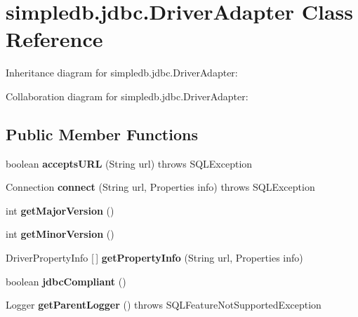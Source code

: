 \hypertarget{classsimpledb_1_1jdbc_1_1DriverAdapter}{}\section{simpledb.\+jdbc.\+Driver\+Adapter Class Reference}
\label{classsimpledb_1_1jdbc_1_1DriverAdapter}


Inheritance diagram for simpledb.\+jdbc.\+Driver\+Adapter\+:


Collaboration diagram for simpledb.\+jdbc.\+Driver\+Adapter\+:
\subsection*{Public Member Functions}
\begin{DoxyCompactItemize}
\item 
\mbox{\label{classsimpledb_1_1jdbc_1_1DriverAdapter_aae0fb055edb3e7afc99e185941011dd5}} 
boolean {\bfseries accepts\+U\+RL} (String url)  throws S\+Q\+L\+Exception 
\item 
\mbox{\label{classsimpledb_1_1jdbc_1_1DriverAdapter_acb9880dba71950a0a028ce889a5ca6ba}} 
Connection {\bfseries connect} (String url, Properties info)  throws S\+Q\+L\+Exception 
\item 
\mbox{\label{classsimpledb_1_1jdbc_1_1DriverAdapter_adc212e250bc5e77a1fb81d728da92b73}} 
int {\bfseries get\+Major\+Version} ()
\item 
\mbox{\label{classsimpledb_1_1jdbc_1_1DriverAdapter_ad8e10ea435ac89cad42b656410bd2749}} 
int {\bfseries get\+Minor\+Version} ()
\item 
\mbox{\label{classsimpledb_1_1jdbc_1_1DriverAdapter_a333e202d92b521958f374654ca9a1f41}} 
Driver\+Property\+Info \mbox{[}$\,$\mbox{]} {\bfseries get\+Property\+Info} (String url, Properties info)
\item 
\mbox{\label{classsimpledb_1_1jdbc_1_1DriverAdapter_a21b055f66c07b668332983714e7e1faf}} 
boolean {\bfseries jdbc\+Compliant} ()
\item 
\mbox{\label{classsimpledb_1_1jdbc_1_1DriverAdapter_a9d4d50eca5812924c52578c44f27d10b}} 
Logger {\bfseries get\+Parent\+Logger} ()  throws S\+Q\+L\+Feature\+Not\+Supported\+Exception 
\end{DoxyCompactItemize}


